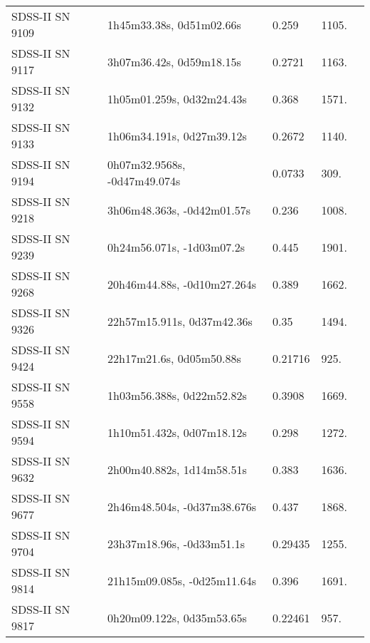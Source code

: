 \begin{longtable}{lllll}
  SDSS-II SN 9109 &       1h45m33.38s, 0d51m02.66s &    0.259 &          1105. &    \citet{2010ApJ...713.1026D} \\
  SDSS-II SN 9117 &       3h07m36.42s, 0d59m18.15s &   0.2721 &          1163. &    \citet{2011ApJ...738..162S} \\
  SDSS-II SN 9132 &      1h05m01.259s, 0d32m24.43s &    0.368 &          1571. &    \citet{2010ApJ...713.1026D} \\
  SDSS-II SN 9133 &      1h06m34.191s, 0d27m39.12s &   0.2672 &          1140. &    \citet{2011ApJ...738..162S} \\
  SDSS-II SN 9194 &   0h07m32.9568s, -0d47m49.074s &   0.0733 &           309. &    \citet{20096dF...C...0000J} \\
  SDSS-II SN 9218 &     3h06m48.363s, -0d42m01.57s &    0.236 &          1008. &    \citet{2010ApJ...713.1026D} \\
  SDSS-II SN 9239 &      0h24m56.071s, -1d03m07.2s &    0.445 &          1901. &    \citet{2011ApJ...738..162S} \\
  SDSS-II SN 9268 &    20h46m44.88s, -0d10m27.264s &    0.389 &          1662. &    \citet{2011ApJ...738..162S} \\
  SDSS-II SN 9326 &     22h57m15.911s, 0d37m42.36s &     0.35 &          1494. &    \citet{2011ApJ...738..162S} \\
  SDSS-II SN 9424 &       22h17m21.6s, 0d05m50.88s &  0.21716 &           925. &    \citet{2016SDSSD.C...0000:} \\
  SDSS-II SN 9558 &      1h03m56.388s, 0d22m52.82s &   0.3908 &          1669. &    \citet{2011ApJ...738..162S} \\
  SDSS-II SN 9594 &      1h10m51.432s, 0d07m18.12s &    0.298 &          1272. &    \citet{2011ApJ...738..162S} \\
  SDSS-II SN 9632 &      2h00m40.882s, 1d14m58.51s &    0.383 &          1636. &    \citet{2010ApJ...713.1026D} \\
  SDSS-II SN 9677 &    2h46m48.504s, -0d37m38.676s &    0.437 &          1868. &    \citet{2011ApJ...738..162S} \\
  SDSS-II SN 9704 &      23h37m18.96s, -0d33m51.1s &  0.29435 &          1255. &    \citet{2016SDSSD.C...0000:} \\
  SDSS-II SN 9814 &    21h15m09.085s, -0d25m11.64s &    0.396 &          1691. &    \citet{2011ApJ...738..162S} \\
  SDSS-II SN 9817 &      0h20m09.122s, 0d35m53.65s &  0.22461 &           957. &    \citet{2016SDSSD.C...0000:} \\

\end{longtable}
